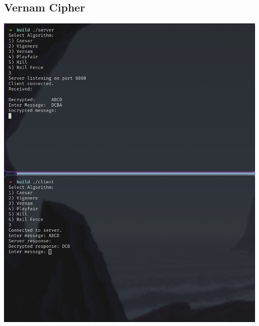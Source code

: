 \documentclass[titlepage]{article}
\begin{document}
\subsection{Vernam Cipher}
\includegraphics[scale=0.4]{vernam.png}
\end{document}
